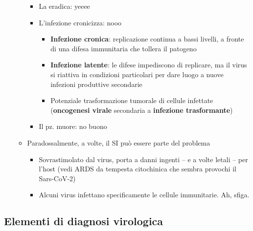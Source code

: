 \documentclass[italian,]{article}
\providecommand{\tightlist}{%
  \setlength{\itemsep}{0pt}\setlength{\parskip}{0pt}}
\begin{document}
\begin{itemize}
\begin{itemize}
    \begin{itemize}
    \tightlist
    \item
      La eradica: yeeee
    \item
      L'infezione cronicizza: nooo

      \begin{itemize}
      \tightlist
      \item
        \textbf{Infezione cronica}: replicazione continua a bassi
        livelli, a fronte di una difesa immunitaria che tollera il
        patogeno
      \item
        \textbf{Infezione latente}: le difese impediscono di replicare,
        ma il virus si riattiva in condizioni particolari per dare luogo
        a nuove infezioni produttive secondarie
      \item
        Potenziale trasformazione tumorale di cellule infettate
        (\textbf{oncogenesi virale} secondaria a \textbf{infezione
        trasformante})
      \end{itemize}
    \item
      Il pz. muore: no buono
    \end{itemize}
  \item
    Paradossalmente, a volte, il SI può essere parte del problema

    \begin{itemize}
    \tightlist
    \item
      Sovrastimolato dal virus, porta a danni ingenti -- e a volte
      letali -- per l'host (vedi ARDS da tempesta citochinica che sembra
      provochi il Sars-CoV-2)
    \item
      Alcuni virus infettano specificamente le cellule immunitarie. Ah,
      sfiga.
    \end{itemize}
  \end{itemize}
\end{itemize}

\hypertarget{elementi-di-diagnosi-virologica}{%
\subsection{Elementi di diagnosi
virologica}\label{elementi-di-diagnosi-virologica}}
\end{document}

